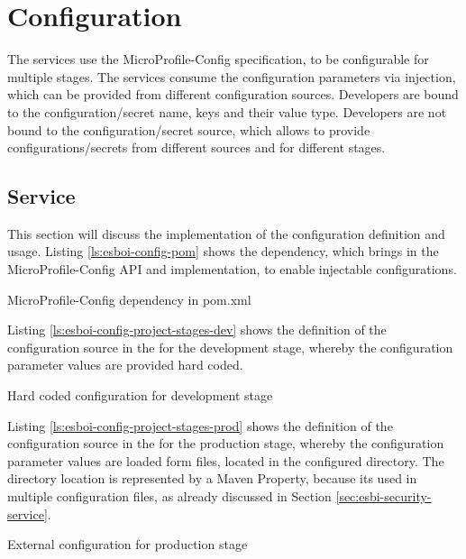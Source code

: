 \section{Configuration}
\label{sec:esbi-configuration}
The services use the MicroProfile-Config specification, to be configurable for multiple stages. The services consume the configuration parameters via injection, which can be provided from different configuration sources. Developers are bound to the configuration/secret name, keys and their value type. Developers are not bound to the configuration/secret source, which allows to provide configurations/secrets from different sources and for different stages. 

\subsection{Service}
\label{sec:esbi-config-service}
This section will discuss the implementation of the configuration definition and usage. Listing \vref{ls:esboi-config-pom} shows the dependency, which brings in the MicroProfile-Config API and implementation, to enable injectable configurations.
 
\begin{listing}[h]
	\caption{MicroProfile-Config dependency in pom.xml}
	\label{ls:esboi-config-pom}
\end{listing}

Listing \vref{ls:esboi-config-project-stages-dev} shows the definition of the configuration source in the  for the development stage, whereby the configuration parameter values are provided hard coded.
\newpage

\begin{listing}[h]
	\caption{Hard coded configuration for development stage}
	\label{ls:esboi-config-project-stages-dev}
\end{listing}

Listing \vref{ls:esboi-config-project-stages-prod} shows the definition of the configuration source in the  for the production stage, whereby the configuration parameter values are loaded form files, located in the configured directory. The directory location is represented by a Maven Property, because its used in multiple configuration files, as already discussed in Section \vref{sec:esbi-security-service}.

\begin{listing}[h]
	\caption{External configuration for production stage}
	\label{ls:esboi-config-project-stages-prod}
\end{listing}


